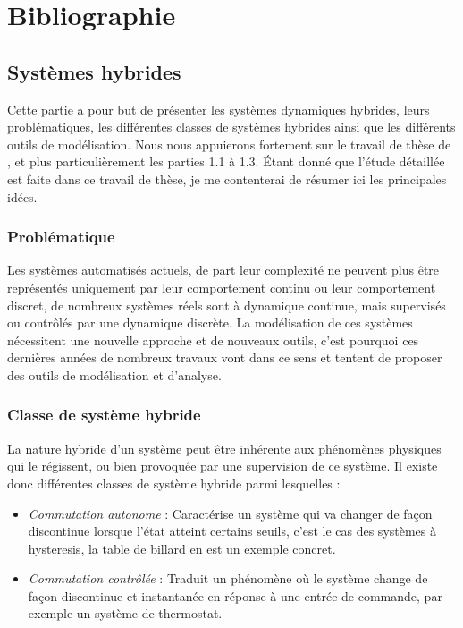 \chapter{Bibliographie}
\section{Systèmes hybrides}

Cette partie a pour but de présenter les systèmes dynamiques hybrides, leurs problématiques, les différentes classes de systèmes hybrides ainsi que les différents outils de modélisation.
Nous nous appuierons fortement sur le travail de thèse de \cite{Kur02}, et plus particulièrement les parties 1.1 à 1.3. Étant donné que l'étude détaillée est faite dans ce travail de thèse, je me contenterai de résumer ici les principales idées.

\subsection{Problématique}
Les systèmes automatisés actuels, de part leur complexité ne peuvent plus être représentés uniquement par leur comportement continu ou leur comportement discret, de nombreux systèmes réels sont à dynamique continue, mais supervisés ou contrôlés par une dynamique discrète. La modélisation de ces systèmes nécessitent une nouvelle approche et de nouveaux outils, c'est pourquoi ces dernières années de nombreux travaux vont dans ce sens et tentent de proposer des outils de modélisation et d'analyse.

\subsection{Classe de système hybride}
La nature hybride d'un système peut être inhérente aux phénomènes physiques qui le régissent, ou bien provoquée par une supervision de ce système. Il existe donc différentes classes de système hybride parmi lesquelles : 
\begin{itemize}
	\item \emph{Commutation autonome} : Caractérise un système qui va changer de façon discontinue lorsque l'état atteint certains seuils, c'est le cas des systèmes à hysteresis, la table de billard en est un exemple concret.
	\item \emph{Commutation contrôlée} : Traduit un phénomène où le système change de façon discontinue et instantanée en réponse à une entrée de commande, par exemple un système de thermostat. 
\end{itemize}

